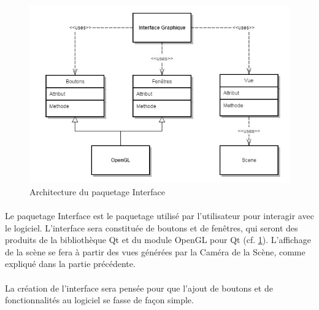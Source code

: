 \begin{figure}[h]
		\centering
		\includegraphics[scale=0.4]{package_interface.jpg}
		\caption{\label{fig:paqInterface} Architecture du paquetage Interface}
\end{figure}

\paragraph{}
Le paquetage Interface est le paquetage utilisé par l’utilisateur pour interagir avec le logiciel. L’interface sera constituée de boutons et de fenêtres, qui seront des produits de la bibliothèque Qt et du module OpenGL pour Qt (cf. \ref{fig:paqInterface}). L’affichage de la scène se fera à partir des vues générées par la Caméra de la Scène, comme expliqué dans la partie précédente.

\paragraph{}
La création de l’interface sera pensée pour que l’ajout de boutons et de fonctionnalités au logiciel se fasse de façon simple.

\newpage
